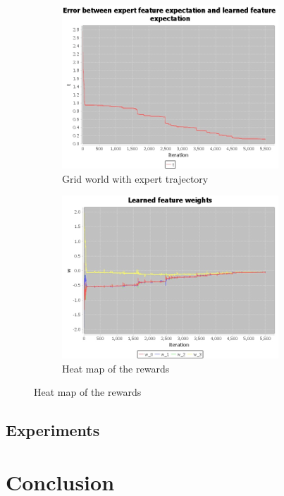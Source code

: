 \documentclass[10pt,a4paper,twocolumn]{article}
\begin{document}
\begin{figure}
\begin{subfigure}[b]{0.5\textwidth}
	\includegraphics[width=\textwidth]{experiment_2_t}
	\caption{Grid world with expert trajectory}
	\label{fig:experiment1t}
\end{subfigure}
\begin{subfigure}[b]{0.5\textwidth}
	\includegraphics[width=\textwidth]{experiment_2_w}
	\caption{Heat map of the rewards}
	\label{fig:experiment1w}
\end{subfigure}
\end{figure}




\subsection{Experiments}

\section{Conclusion}

 

\end{document}
